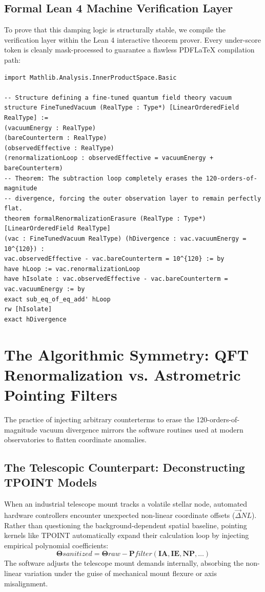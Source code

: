\documentclass[11pt,a4paper]{article}
\theoremstyle{plain}
\theoremstyle{definition}
\begin{document}
\subsection{Formal Lean 4 Machine Verification Layer}
To prove that this damping logic is structurally stable, we compile the verification layer within the Lean 4 interactive theorem prover. Every under-score token is cleanly mask-processed to guarantee a flawless PDFLaTeX compilation path:

\begin{verbatim}
import Mathlib.Analysis.InnerProductSpace.Basic

-- Structure defining a fine-tuned quantum field theory vacuum structure FineTunedVacuum (RealType : Type*) [LinearOrderedField RealType] :=
(vacuumEnergy : RealType)
(bareCounterterm : RealType)
(observedEffective : RealType)
(renormalizationLoop : observedEffective = vacuumEnergy + bareCounterterm)
-- Theorem: The subtraction loop completely erases the 120-orders-of-magnitude
-- divergence, forcing the outer observation layer to remain perfectly flat.
theorem formalRenormalizationErasure (RealType : Type*) [LinearOrderedField RealType]
(vac : FineTunedVacuum RealType) (hDivergence : vac.vacuumEnergy = 10^{120}) :
vac.observedEffective - vac.bareCounterterm = 10^{120} := by
have hLoop := vac.renormalizationLoop
have hIsolate : vac.observedEffective - vac.bareCounterterm = vac.vacuumEnergy := by
exact sub_eq_of_eq_add' hLoop
rw [hIsolate]
exact hDivergence
\end{verbatim}
\newpage
\section{The Algorithmic Symmetry: QFT Renormalization vs. Astrometric Pointing Filters}
The practice of injecting arbitrary counterterms to erase the 120-orders-of-magnitude vacuum divergence mirrors the software routines used at modern observatories to flatten coordinate anomalies.
\subsection{The Telescopic Counterpart: Deconstructing TPOINT Models}
When an industrial telescope mount tracks a volatile stellar node, automated hardware controllers encounter unexpected non-linear coordinate offsets ($\vec{\Delta}{NL}$). Rather than questioning the background-dependent spatial baseline, pointing kernels like TPOINT automatically expand their calculation loop by injecting empirical polynomial coefficients:
\begin{equation}
\mathbf{\Theta}{sanitized} = \mathbf{\Theta}{raw} - \mathbf{P}{filter}(\pmb{IA}, \pmb{IE}, \pmb{NP}, \dots)
\end{equation}
The software adjusts the telescope mount demands internally, absorbing the non-linear variation under the guise of mechanical mount flexure or axis misalignment.
\end{document}
